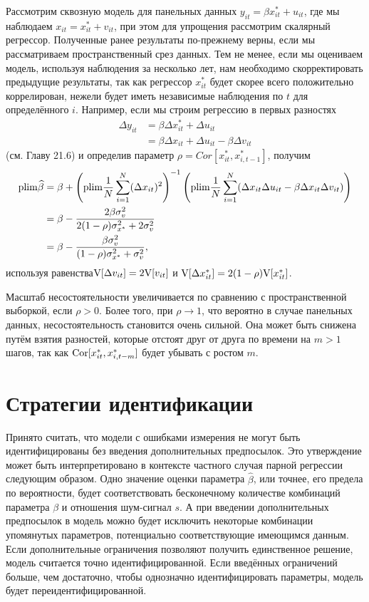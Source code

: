 Рассмотрим сквозную модель для панельных данных $y_{it}=\beta x^*_{it}+u_{it}$, где мы наблюдаем $x_{it}=x^*_{it}+v_{it}$, при этом для упрощения рассмотрим скалярный регрессор. Полученные ранее результаты по-прежнему верны, если мы рассматриваем пространственный срез данных. Тем не менее, если мы оцениваем модель, используя наблюдения за несколько лет, нам необходимо скорректировать  предыдущие результаты, так как регрессор $x^*_{it}$ будет скорее всего положительно коррелирован, нежели  будет иметь независимые наблюдения по $t$ для определённого $i$. Например, если мы строим регрессию в первых разностях
\begin{align*}
\Delta y_{it}&=\beta \Delta x^*_{it}+ \Delta u_{it} \\
&= \beta \Delta x_{it}+\Delta u_{it}-\beta \Delta v_{it}
\end{align*}
(см. Главу 21.6) и определив параметр $\rho = Cor[x^*_{it}, x^*_{i,t-1}]$, получим
\begin{align*}
\mathrm{plim }\widehat{\beta}&=\beta + \left( \mathrm{plim } \frac{1}{N} \sum \limits^{N}_{i=1}(\Delta x_{it})^2 \right)^{-1} \left( \mathrm{plim } \frac{1}{N} \sum \limits^{N}_{i=1}(\Delta x_{it} \Delta u_{it}-\beta \Delta x_{it} \Delta v_{it}) \right) \\
&= \beta - \frac{2\beta \sigma^2_v}{2(1-\rho)\sigma^2_{x^*}+2\sigma^2_v} \\
&=\beta-\frac{\beta \sigma^2_v}{(1-\rho)\sigma^2_{x^*}+\sigma^2_v},
\end{align*}
используя равенства$\mathrm{V}[\Delta v_{it}]=2\mathrm{V}[v_{it}]$ и $\mathrm{V}[\Delta x^*_{it}]=2(1-\rho)\mathrm{V}[x^*_{it}]$.

Масштаб несостоятельности увеличивается по сравнению с пространственной выборкой, если $\rho>0$. Более того, при $\rho\rightarrow 1$, что вероятно в случае панельных данных, несостоятельность становится очень сильной. Она может быть снижена путём взятия разностей, которые отстоят друг от друга по времени на $m>1$ шагов, так как $\mathrm{Cor}[x^*_{it}, x^*_{i,t-m}]$ будет убывать с ростом $m$.

\section{Стратегии идентификации} 

Принято считать, что модели с ошибками измерения не могут быть идентифицированы без введения дополнительных предпосылок. Это утверждение может быть интерпретировано в контексте частного  случая парной регрессии следующим образом. Одно  значение оценки параметра $\widehat{\beta}$, или точнее, его предела по вероятности, будет соответствовать бесконечному количестве комбинаций параметра $\beta$ и отношения шум-сигнал $s$. А при введении дополнительных предпосылок в модель можно будет исключить некоторые комбинации упомянутых параметров, потенциально соответствующие имеющимся данным. Если дополнительные ограничения позволяют получить единственное решение, модель считается точно идентифицированной. Если введённых ограничений больше, чем достаточно, чтобы однозначно идентифицировать параметры, модель будет переидентифицированной.

